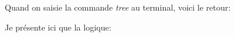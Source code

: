 \documentclass[a4paper,11pt]{article}
\begin{document}
            \noindent Quand on saisie la commande \textit{tree} au terminal, voici  le retour: 
            \begin{figure}[ht]
            \end{figure}

            \newpage
            \noindent Je présente ici que la logique:
\end{document}
